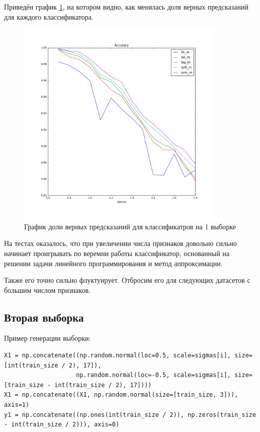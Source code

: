 \documentclass[a4paper]{article}
\begin{document}
Приведён график \ref{pic:im1}, на котором видно, как менялась доля верных предсказаний для каждого классификатора.

\begin{figure}[H]
\centering
\includegraphics[width=10cm]{first_dataset}
\caption{График доли верных предсказаний для классификатров на 1 выборке}
\label{pic:im1}
\end{figure}

На тестах оказалось, что при увеличении числа признаков довольно сильно начинает проигрывать по веремни работы классификатор, основанный на решении задачи линейного программирования и метод аппроксимации.

Также его точно сильно флуктуирует. Отбросим его для следующих датасетов с большим числом признаков.

\subsection{Вторая выборка}

Пример генерации выборки:

\begin{lstlisting}
X1 = np.concatenate((np.random.normal(loc=0.5, scale=sigmas[i], size=[int(train_size / 2), 17]),
                    np.random.normal(loc=-0.5, scale=sigmas[i], size=[train_size - int(train_size / 2), 17]))) 
X1 = np.concatenate((X1, np.random.normal(size=[train_size, 3])), axis=1)
y1 = np.concatenate((np.ones(int(train_size / 2)), np.zeros(train_size - int(train_size / 2))), axis=0)
\end{lstlisting}
\end{document}
